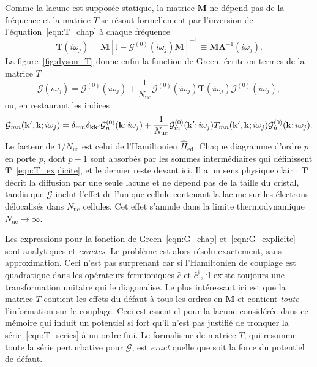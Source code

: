 Comme la lacune est supposée statique, la matrice $\bm M$ ne dépend pas de la fréquence et la matrice $T$ se résout formellement par l'inversion de l'équation~\eqref{eqn:T_chap} à chaque fréquence
\begin{equation}
    \bm T(i\omega_j) = \bm M\left[\mathbb{I}-\bm{\mathcal{G}}^{(0)}(i\omega_j)\bm M\right]^{-1}\equiv \bm M \bm\Lambda^{-1}(i\omega_j).\label{eqn:T_inv}
\end{equation}
La figure~\ref{fig:dyson_T} donne enfin la fonction de Green, écrite en termes de la matrice $T$
\begin{equation}
    \bm{\mathcal{G}}(i\omega_j) = \bm{\mathcal{G}}^{(0)}(i\omega_j)+\frac{1}{N_\text{uc}}\bm{\mathcal{G}}^{(0)}(i\omega_j)\bm T(i\omega_j)\bm{\mathcal{G}}^{(0)}(i\omega_j),\label{eqn:G_chap}
\end{equation}
ou, en restaurant les indices
\begin{equation}
    \mathcal{G}_{mn}(\mathbf{k}',\mathbf{k};i\omega_j) =\delta_{mn}\delta_{\mathbf{k}\mathbf{k}'}\mathcal{G}^{(0)}_{n}(\mathbf{k};i\omega_j)+\frac{1}{N_\text{uc}}\mathcal{G}_{m}^{(0)}(\mathbf{k}';i\omega_j)T_{mn}(\mathbf{k}',\mathbf{k}; i\omega_j)\mathcal{G}_{n}^{(0)}(\mathbf{k};i\omega_j).\label{eqn:G_explicite}
\end{equation}
Le facteur de $1/N_\text{uc}$ est celui de l'Hamiltonien $\hat H_\text{ed}$. Chaque diagramme d'ordre $p$ en porte $p$, dont $p-1$ sont absorbés par les sommes intermédiaires qui définissent $\bm T$~\eqref{eqn:T_explicite}, et le dernier reste devant ici. Il a un sens physique clair : $\bm T$ décrit la diffusion par une seule lacune et ne dépend pas de la taille du cristal, tandis que $\bm{\mathcal{G}}$ inclut l'effet de l'unique cellule contenant la lacune sur les électrons délocalisés dans $N_\text{uc}$ cellules. Cet effet s'annule dans la limite thermodynamique $N_\text{uc}\to \infty$.

Les expressions pour la fonction de Green~\eqref{eqn:G_chap} et~\eqref{eqn:G_explicite} sont analytiques et \textit{exactes}. Le problème est alors résolu exactement, sans approximation. Ceci n'est pas surprenant car si l'Hamiltonien de couplage est quadratique dans les opérateurs fermioniques $\hat c$ et $\hat c^\dag$, il existe toujours une transformation unitaire qui le diagonalise. Le plus intéressant ici est que la matrice $T$ contient les effets du défaut à tous les ordres en $\bm M$ et contient \textit{toute} l'information sur le couplage. Ceci est essentiel pour la lacune considérée dans ce mémoire qui induit un potentiel si fort qu'il n'est pas justifié de tronquer la série~\eqref{eqn:T_series} à un ordre fini. Le formalisme de matrice $T$, qui resomme toute la série perturbative pour $\bm{\mathcal{G}}$, est \textit{exact} quelle que soit la force du potentiel de défaut.

